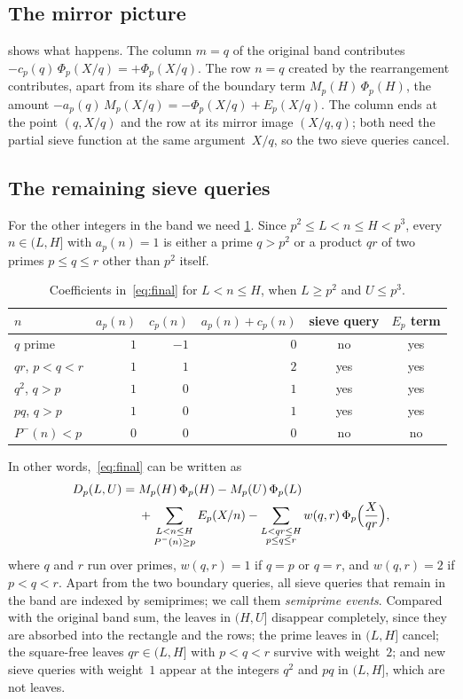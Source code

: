 \documentclass[11pt,a4paper]{amsart}
\numberwithin{equation}{section}
\newcommand{\Pminus}{P^{-}}
\begin{document}
\subsection{The mirror picture}
 shows what happens. The column $m=q$ of the original band
contributes $-c_p(q)\,\Phi_p(X/q)=+\Phi_p(X/q)$. The row $n=q$ created by the
rearrangement contributes, apart from its share of the boundary term
$M_p(H)\,\Phi_p(H)$, the amount $-a_p(q)\,M_p(X/q)=-\Phi_p(X/q)+E_p(X/q)$. The
column ends at the point $(q,X/q)$ and the row at its mirror image $(X/q,q)$;
both need the partial sieve function at the same argument~$X/q$, so the two
sieve queries cancel.

\subsection{The remaining sieve queries}
For the other integers in the band we need \cref{tab:weights}. Since
$p^2\le L<n\le H<p^3$, every $n\in(L,H]$ with $a_p(n)=1$ is either a prime
$q>p^2$ or a product $qr$ of two primes $p\le q\le r$ other than $p^2$ itself.

\begin{table}[htb]
\caption{Coefficients in~\eqref{eq:final} for $L<n\le H$, when $L\ge p^2$ and
$U\le p^3$.}\label{tab:weights}
\centering
\begin{tabular}{@{}lrrrcc@{}}
\toprule
$n$ & $a_p(n)$ & $c_p(n)$ & $a_p(n)+c_p(n)$ & sieve query & $E_p$ term\\
\midrule
$q$ prime & $1$ & $-1$ & $0$ & no & yes\\
$qr$, $p<q<r$ & $1$ & $1$ & $2$ & yes & yes\\
$q^2$, $q>p$ & $1$ & $0$ & $1$ & yes & yes\\
$pq$, $q>p$ & $1$ & $0$ & $1$ & yes & yes\\
$\Pminus(n)<p$ & $0$ & $0$ & $0$ & no & no\\
\bottomrule
\end{tabular}
\end{table}

In other words,~\eqref{eq:final} can be written as
\begin{equation}\label{eq:events}
\begin{split}
  D_p(L,U)={}&M_p(H)\,\Phi_p(H)-M_p(U)\,\Phi_p(L)\\
  &+\sum_{\substack{L<n\le H\\ \Pminus(n)\ge p}}E_p(X/n)
   -\sum_{\substack{L<qr\le H\\ p\le q\le r}}w(q,r)\,\Phi_p\Bigl(\frac{X}{qr}\Bigr),
\end{split}
\end{equation}
where $q$ and $r$ run over primes, $w(q,r)=1$ if $q=p$ or $q=r$, and
$w(q,r)=2$ if $p<q<r$. Apart from the two boundary queries, all sieve
queries that remain in the band are indexed by semiprimes; we call them \emph{semiprime events}. Compared with the original
band sum, the leaves in $(H,U]$ disappear completely, since they are absorbed
into the rectangle and the rows; the prime leaves in $(L,H]$ cancel; the
square-free leaves $qr\in(L,H]$ with $p<q<r$ survive with weight~$2$; and new
sieve queries with weight~$1$ appear at the integers $q^2$ and $pq$ in
$(L,H]$, which are not leaves.
\end{document}
